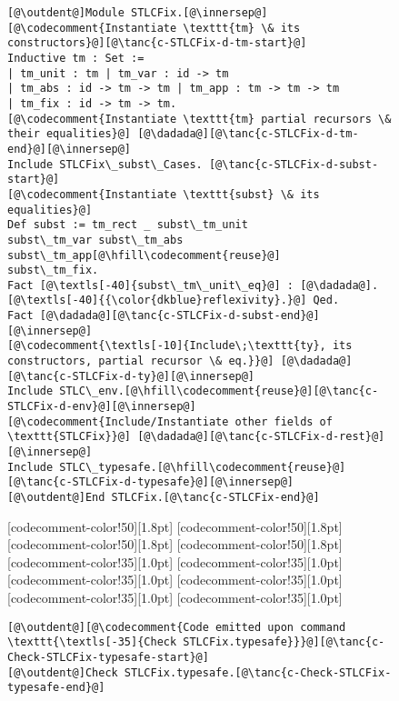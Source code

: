 \begin{figure}
\begin{minipage}{\textwidth}
\begin{multicols}{2}
\begin{lstlisting}
[@\outdent@]Module STLCFix.[@\innersep@]
[@\codecomment{Instantiate \texttt{tm} \& its constructors}@][@\tanc{c-STLCFix-d-tm-start}@]
Inductive tm : Set :=
| tm_unit : tm | tm_var : id -> tm
| tm_abs : id -> tm -> tm | tm_app : tm -> tm -> tm
| tm_fix : id -> tm -> tm.
[@\codecomment{Instantiate \texttt{tm} partial recursors \& their equalities}@] [@\dadada@][@\tanc{c-STLCFix-d-tm-end}@][@\innersep@]
Include STLCFix\_subst\_Cases. [@\tanc{c-STLCFix-d-subst-start}@]
[@\codecomment{Instantiate \texttt{subst} \& its equalities}@]
Def subst := tm_rect _ subst\_tm_unit
subst\_tm_var subst\_tm_abs subst\_tm_app[@\hfill\codecomment{reuse}@]
subst\_tm_fix.
Fact [@\textls[-40]{subst\_tm\_unit\_eq}@] : [@\dadada@]. [@\textls[-40]{{\color{dkblue}reflexivity}.}@] Qed.
Fact [@\dadada@][@\tanc{c-STLCFix-d-subst-end}@][@\innersep@]
[@\codecomment{\textls[-10]{Include\;\texttt{ty}, its constructors, partial recursor \& eq.}}@] [@\dadada@][@\tanc{c-STLCFix-d-ty}@][@\innersep@]
Include STLC\_env.[@\hfill\codecomment{reuse}@][@\tanc{c-STLCFix-d-env}@][@\innersep@]
[@\codecomment{Include/Instantiate other fields of \texttt{STLCFix}}@] [@\dadada@][@\tanc{c-STLCFix-d-rest}@][@\innersep@]
Include STLC\_typesafe.[@\hfill\codecomment{reuse}@][@\tanc{c-STLCFix-d-typesafe}@][@\innersep@]
[@\outdent@]End STLCFix.[@\tanc{c-STLCFix-end}@]
\end{lstlisting}

[codecomment-color!50][1.8pt]
[codecomment-color!50][1.8pt]
[codecomment-color!50][1.8pt]
[codecomment-color!50][1.8pt]
[codecomment-color!35][1.0pt]
[codecomment-color!35][1.0pt]
[codecomment-color!35][1.0pt]
[codecomment-color!35][1.0pt]
[codecomment-color!35][1.0pt]
[codecomment-color!35][1.0pt]

\vspace{-8pt}


\begin{lstlisting}
[@\outdent@][@\codecomment{Code emitted upon command \texttt{\textls[-35]{Check STLCFix.typesafe}}}@][@\tanc{c-Check-STLCFix-typesafe-start}@]
[@\outdent@]Check STLCFix.typesafe.[@\tanc{c-Check-STLCFix-typesafe-end}@]
\end{lstlisting}


\end{multicols}
\end{minipage}
\end{figure}
